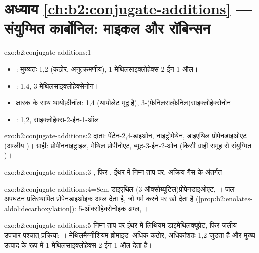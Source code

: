\section*{अध्याय \ref{ch:b2:conjugate-additions} --- संयुग्मित कार्बोनिल: माइकल और रॉबिन्सन}

\begin{solution}{exo:b2:conjugate-additions:1}
\begin{itemize}
  \item {}: मुख्यतः 1,2 (कठोर, अनुत्क्रमणीय), 1-मेथिलसाइक्लोहेक्स-2-ईन-1-ऑल।
  \item {}: 1,4, 3-मेथिलसाइक्लोहेक्सेनोन।
  \item क्षारक के साथ थायोफ़ीनॉल: 1,4 (थायोलेट मृदु है), 3-(फ़ेनिलसल्फ़ेनिल)साइक्लोहेक्सेनोन।
  \item {}: 1,2, साइक्लोहेक्स-2-ईन-1-ऑल।
\end{itemize}
\end{solution}

\begin{solution}{exo:b2:conjugate-additions:2}
दाता: पेंटेन-2,4-डाइओन, नाइट्रोमेथेन, डाइएथिल प्रोपेनडाइओएट (अम्लीय )। ग्राही:
प्रोपीननाइट्राइल, मेथिल प्रोपीनोएट, ब्यूट-3-ईन-2-ओन (किसी ग्राही समूह से संयुग्मित )।
\end{solution}

\begin{solution}{exo:b2:conjugate-additions:3}
, फिर , ईथर में निम्न
ताप पर, अक्रिय गैस के अंतर्गत।
\end{solution}

\begin{solution}{exo:b2:conjugate-additions:4}\emergencystretch=8em
डाइएथिल (3-ऑक्सोब्यूटिल)प्रोपेनडाइओएट, । जल-अपघटन प्रतिस्थापित
प्रोपेनडाइओइक अम्ल देता है, जो गर्म करने पर  खो देता है (\cref{prop:b2:enolates-aldol:decarboxylation}):
5-ऑक्सोहेक्सेनोइक अम्ल, ।
\end{solution}

\begin{solution}{exo:b2:conjugate-additions:5}
निम्न ताप पर ईथर में लिथियम डाइमेथिलक्यूप्रेट, फिर जलीय उपचार-पश्चात् प्रक्रिया: ।
मेथिलमैग्नीशियम ब्रोमाइड, अधिक कठोर, अधिकांशतः 1,2 जुड़ता है और मुख्य उत्पाद के रूप में
1-मेथिलसाइक्लोहेक्स-2-ईन-1-ऑल देता है।
\end{solution}

